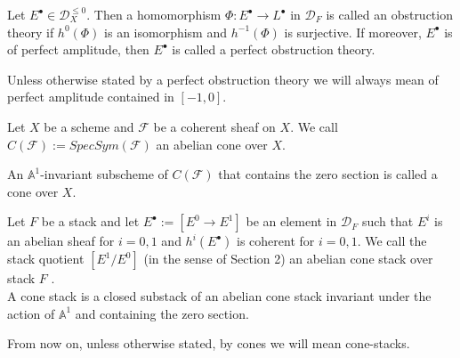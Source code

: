 \begin{definition}\label{manolacheVirtualPullbacks2012-def-2.5}
Let $E^{\bullet}\in\mathcal{D}^{\leq0}_X$. Then a homomorphism $\Phi: E^{\bullet}\to L^{\bullet}$ in $\mathcal{D}_F$ is called an obstruction theory if $h^0(\Phi)$ is an isomorphism and $h^{-1}(\Phi)$ is surjective. If moreover, $E^{\bullet}$ is of perfect amplitude, then $E^{\bullet}$ is called a perfect obstruction theory.
\end{definition}

\begin{convention}\label{manolacheVirtualPullbacks2012-convention-2.6}
Unless otherwise stated by a perfect obstruction theory we will always mean of perfect amplitude  contained in $[-1,0]$.
\end{convention}

\begin{definition}\label{manolacheVirtualPullbacks2012-def-2.7}
Let $X$ be a scheme and $\mathcal{F}$ be a coherent sheaf on $X$. We call $C(\mathcal{F}):=Spec Sym(\mathcal{F})$ an abelian cone over $X$.
\end{definition}

\begin{definition}\label{manolacheVirtualPullbacks2012-def-2.8}
 An $\mathbb{A}^1$-invariant subscheme of $C(\mathcal{F})$ that contains the zero section is called a cone over $X$.
\end{definition}

\begin{definition}\label{manolacheVirtualPullbacks2012-def-2.9}
Let $F$ be a stack and let $E^{\bullet}:=[E^0\to E^1]$ be an element in $\mathcal{D}_F$ such that $E^{i}$ is an abelian sheaf for $i=0,1$ and $h^i({E^{\bullet}})$ is coherent for $i=0,1$. We call the stack quotient $[E^1/E^0]$ (in the sense of \cite{bf} Section 2) an abelian cone stack over stack $F$ .
\\A cone stack is a closed substack of an abelian cone stack invariant under the action of $\mathbb{A}^1$ and containing the zero section.
\end{definition}

\begin{convention}\label{manolacheVirtualPullbacks2012-convention-2.10}
\label{manolacheVirtualPullbacks2012-stack}From now on, unless otherwise stated, by cones we will mean cone-stacks.
\end{convention}

